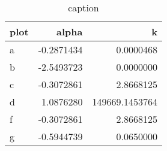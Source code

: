 \begin{table}[ht]
\centering
\begin{tabular}{lrr}
  \hline
plot & alpha & k \\ 
  \hline
a & -0.2871434 & 0.0000468 \\ 
  b & -2.5493723 & 0.0000000 \\ 
  c & -0.3072861 & 2.8668125 \\ 
  d & 1.0876280 & 149669.1453764 \\ 
  f & -0.3072861 & 2.8668125 \\ 
  g & -0.5944739 & 0.0650000 \\ 
   \hline
\end{tabular}
\caption{caption} 
\label{tab:fitting_insideLambda_firstModel_phi1_nm400_dynamic_randomBipartite_allowUnlinked}
\end{table}
